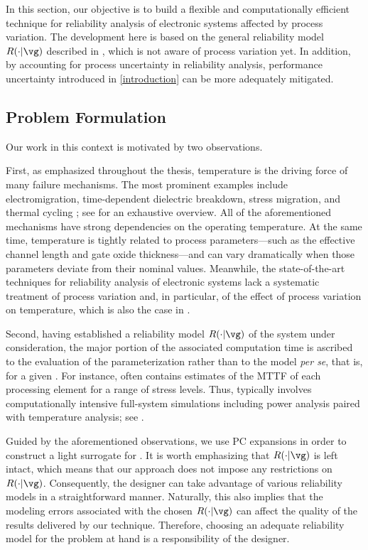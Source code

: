 In this section, our objective is to build a flexible and computationally
efficient technique for reliability analysis of electronic systems affected by
process variation. The development here is based on the general reliability
model $R(\cdot | \vg)$ described in , which is not
aware of process variation yet. In addition, by accounting for process
uncertainty in reliability analysis, performance uncertainty introduced in
\cref{introduction} can be more adequately mitigated.

\subsection{Problem Formulation}

Our work in this context is motivated by two observations.

First, as emphasized throughout the thesis, temperature is the driving force of
many failure mechanisms. The most prominent examples include electromigration,
time-dependent dielectric breakdown, stress migration, and thermal cycling
\cite{xiang2010}; see \cite{jedec2016} for an exhaustive overview. All of the
aforementioned mechanisms have strong dependencies on the operating temperature.
At the same time, temperature is tightly related to process parameters---such as
the effective channel length and gate oxide thickness---and can vary
dramatically when those parameters deviate from their nominal values. Meanwhile,
the state-of-the-art techniques for reliability analysis of electronic systems
lack a systematic treatment of process variation and, in particular, of the
effect of process variation on temperature, which is also the case in
.

Second, having established a reliability model $R(\cdot | \vg)$ of the system
under consideration, the major portion of the associated computation time is
ascribed to the evaluation of the parameterization \vg rather than to the model
\emph{per se}, that is, for a given \vg. For instance, \vg often contains
estimates of the \ac{MTTF} of each processing element for a range of stress
levels. Thus, \vg typically involves computationally intensive full-system
simulations including power analysis paired with temperature analysis; see
.

Guided by the aforementioned observations, we use \ac{PC} expansions in order to
construct a light surrogate for \vg. It is worth emphasizing that $R(\cdot |
\vg)$ is left intact, which means that our approach does not impose any
restrictions on $R(\cdot | \vg)$. Consequently, the designer can take advantage
of various reliability models in a straightforward manner. Naturally, this also
implies that the modeling errors associated with the chosen $R(\cdot | \vg)$ can
affect the quality of the results delivered by our technique. Therefore,
choosing an adequate reliability model for the problem at hand is a
responsibility of the designer.


